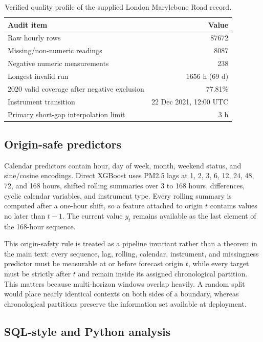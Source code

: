 \documentclass[sn-mathphys-num]{sn-jnl}
\begin{document}
\begin{table}[tbp]
\centering
\caption{Verified quality profile of the supplied London Marylebone Road record.}
\label{tab:dataaudit}
\small
\begin{tabular}{lr}
\toprule
Audit item & Value \\
\midrule
Raw hourly rows & \num{87672} \\
Missing/non-numeric readings & \num{8087} \\
Negative numeric measurements & \num{238} \\
Longest invalid run & \num{1656} h (69 d) \\
2020 valid coverage after negative exclusion & 77.81\% \\
Instrument transition & 22 Dec 2021, 12:00 UTC \\
Primary short-gap interpolation limit & 3 h \\
\bottomrule
\end{tabular}
\end{table}

\subsection{Origin-safe predictors}
\label{sec:originsafe}

Calendar predictors contain hour, day of week, month, weekend status, and
sine/cosine encodings. Direct XGBoost uses PM2.5 lags at 1, 2, 3, 6, 12, 24,
48, 72, and 168 hours, shifted rolling summaries over 3 to 168 hours,
differences, cyclic calendar variables, and instrument type. Every rolling
summary is computed after a one-hour shift, so a feature attached to origin
\(t\) contains values no later than \(t-1\). The current value \(y_t\) remains
available as the last element of the 168-hour sequence.

This origin-safety rule is treated as a pipeline invariant rather than a
theorem in the main text: every sequence, lag, rolling, calendar, instrument,
and missingness predictor must be measurable at or before forecast origin
\(t\), while every target must be strictly after \(t\) and remain inside its
assigned chronological partition. This matters because multi-horizon windows
overlap heavily. A random split would place nearly identical contexts on both
sides of a boundary, whereas chronological partitions preserve the information
set available at deployment.

\subsection{SQL-style and Python analysis}
\label{sec:query-analysis}
\end{document}
